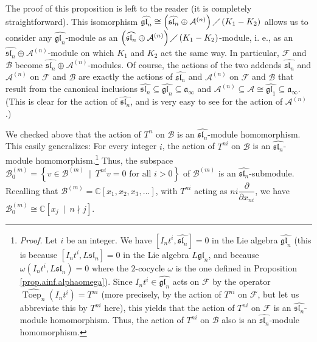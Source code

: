 \documentclass[etingof-lie.tex]{subfiles}
\begin{document}
The proof of this proposition is left to the reader (it is completely
straightforward). This isomorphism $\widehat{\mathfrak{gl}_{n}}\cong\left(
\widehat{\mathfrak{sl}_{n}}\oplus\mathcal{A}^{\left(  n\right)  }\right)
\diagup\left(  K_{1}-K_{2}\right)  $ allows us to consider any
$\widehat{\mathfrak{gl}_{n}}$-module as an $\left(  \widehat{\mathfrak{sl}%
_{n}}\oplus\mathcal{A}^{\left(  n\right)  }\right)  \diagup\left(  K_{1}%
-K_{2}\right)  $-module, i. e., as an $\widehat{\mathfrak{sl}_{n}}%
\oplus\mathcal{A}^{\left(  n\right)  }$-module on which $K_{1}$ and $K_{2}$
act the same way. In particular, $\mathcal{F}$ and $\mathcal{B}$ become
$\widehat{\mathfrak{sl}_{n}}\oplus\mathcal{A}^{\left(  n\right)  }$-modules.
Of course, the actions of the two addends $\widehat{\mathfrak{sl}_{n}}$ and
$\mathcal{A}^{\left(  n\right)  }$ on $\mathcal{F}$ and $\mathcal{B}$ are
exactly the actions of $\widehat{\mathfrak{sl}_{n}}$ and $\mathcal{A}^{\left(
n\right)  }$ on $\mathcal{F}$ and $\mathcal{B}$ that result from the canonical
inclusions $\widehat{\mathfrak{sl}_{n}}\subseteq\widehat{\mathfrak{gl}_{n}%
}\subseteq\mathfrak{a}_{\infty}$ and $\mathcal{A}^{\left(  n\right)
}\subseteq\mathcal{A}\cong\widehat{\mathfrak{gl}_{1}}\subseteq\mathfrak{a}%
_{\infty}$. (This is clear for the action of $\widehat{\mathfrak{sl}_{n}}$,
and is very easy to see for the action of $\mathcal{A}^{\left(  n\right)  }$.)

We checked above that the action of $T^{n}$ on $\mathcal{B}$ is an
$\widehat{\mathfrak{sl}_{n}}$-module homomorphism. This easily generalizes:
For every integer $i$, the action of $T^{ni}$ on $\mathcal{B}$ is an
$\widehat{\mathfrak{sl}_{n}}$-module homomorphism.\footnote{\textit{Proof.}
Let $i$ be an integer. We have $\left[  I_{n}t^{i},\widehat{\mathfrak{sl}_{n}%
}\right]  =0$ in the Lie algebra $\widehat{\mathfrak{gl}_{n}}$ (this is
because $\left[  I_{n}t^{i},L\mathfrak{sl}_{n}\right]  =0$ in the Lie algebra
$L\mathfrak{gl}_{n}$, and because $\omega\left(  I_{n}t^{i},L\mathfrak{sl}%
_{n}\right)  =0$ where the $2$-cocycle $\omega$ is the one defined in
Proposition \ref{prop.ainf.alphaomega}). Since $I_{n}t^{i}\in
\widehat{\mathfrak{gl}_{n}}$ acts on $\mathcal{F}$ by the operator
$\widehat{\operatorname*{Toep}\nolimits_{n}}\left(  I_{n}t^{i}\right)
=T^{ni}$ (more precisely, by the action of $T^{ni}$ on $\mathcal{F}$, but let
us abbreviate this by $T^{ni}$ here), this yields that the action of $T^{ni}$
on $\mathcal{F}$ is an $\widehat{\mathfrak{sl}_{n}}$-module homomorphism.
Thus, the action of $T^{ni}$ on $\mathcal{B}$ also is an
$\widehat{\mathfrak{sl}_{n}}$-module homomorphism.} Thus, the subspace
$\mathcal{B}_{0}^{\left(  m\right)  }=\left\{  v\in\mathcal{B}^{\left(
m\right)  }\ \mid\ T^{ni}v=0\text{ for all }i>0\right\}  $ of $\mathcal{B}%
^{\left(  m\right)  }$ is an $\widehat{\mathfrak{sl}_{n}}$-submodule.
Recalling that $\mathcal{B}^{\left(  m\right)  }=\mathbb{C}\left[  x_{1}%
,x_{2},x_{3},...\right]  $, with $T^{ni}$ acting as $ni\dfrac{\partial
}{\partial x_{ni}}$, we have $\mathcal{B}_{0}^{\left(  m\right)  }%
\cong\mathbb{C}\left[  x_{j}\ \mid\ n\nmid j\right]  $.
\end{document}
